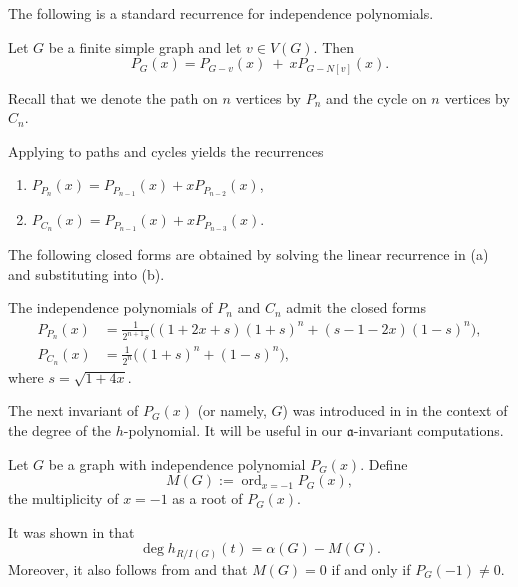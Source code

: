 \documentclass[12pt]{amsart}
\theoremstyle{plain}
\theoremstyle{definition}
\DeclareMathOperator{\ord}{ord}
\begin{document}
The following is a standard recurrence for independence polynomials.

\begin{lem}\label{lem:delete_contract}
Let $G$ be a finite simple graph and let $v\in V(G)$. Then
\[
P_G(x) =  P_{G-v}(x)\ +\ x P_{G-N[v]}(x).
\]
\end{lem}

Recall that we denote the path on $n$ vertices by $P_n$ and the cycle on $n$ vertices by $C_n$.

\begin{remark}\label{rem:ind_poly_path_cycle}
Applying  to paths and cycles yields the recurrences
\begin{enumerate}
\item[(a)] $P_{P_n}(x)=P_{P_{n-1}}(x)+x P_{P_{n-2}}(x)$,
\item[(b)] $P_{C_n}(x)=P_{P_{n-1}}(x)+x P_{P_{n-3}}(x)$.
\end{enumerate}
\end{remark}

The following closed forms are obtained by solving the linear recurrence in
(a) and substituting
into (b).

\begin{lem}\label{rem:closed_ind_path_cycle}
The independence polynomials of $P_n$ and $C_n$ admit the closed forms
\begin{align*}
P_{P_n}(x)
&=\frac{1}{2^{n+1} s}\Big((1+2x+s)(1+s)^n+(s-1-2x)(1-s)^n\Big),\\
P_{C_n}(x)
&=\frac{1}{2^{n}}\Big((1+s)^n+(1-s)^n\Big),
\end{align*}
where $s=\sqrt{1+4x}$.
\end{lem}

The next invariant of $P_G(x)$ (or namely, $G$) was introduced in \cite{biermann2026realizableregdeghpairs} in the
context of the degree of the $h$-polynomial. It will be useful in our $\mathfrak a$-invariant computations.

\begin{defn}\label{def:MG}
Let $G$ be a graph with independence polynomial $P_G(x)$. Define
\[
M(G) := \ord_{x=-1} P_G(x),
\]
the multiplicity of $x=-1$ as a root of $P_G(x)$.
\end{defn}

\begin{remark}\label{rem:deg-h}
It was shown in \cite[Theorem 4.4]{biermann2026realizableregdeghpairs} that
\[
\deg h_{R/I(G)}(t)=  \alpha(G)-M(G).
\]
Moreover, it also follows from \cite[Theorem 3.2]{biermann2024degree} and \cite[Remark 2.10]{biermann2026realizableregdeghpairs} that
$M(G)=0$ if and only if $P_G(-1)\neq 0$.
\end{remark}
\end{document}
